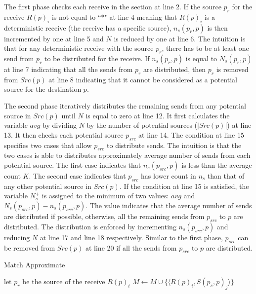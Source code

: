 The first phase checks each receive in the section at line 2. If the source $p_r$ for the receive $R(p)_i$ is not equal to ``$\ast$" at line 4 meaning that $R(p)_i$ is a deterministic receive (the receive has a specific source), $n_s(p_r,p)$ is then incremented by one at line 5 and $N$ is reduced by one at line 6. The intuition is that for any deterministic receive with the source $p_r$, there has to be at least one send from $p_r$ to be distributed for the receive. If $n_s(p_r,p)$ is equal to $N_s(p_r,p)$ at line 7 indicating that all the sends from $p_r$ are distributed, then $p_r$ is removed from $Src(p)$ at line 8 indicating that it cannot be considered as a potential source for the destination $p$. 

The second phase iteratively distributes the remaining sends from any potential source in $Src(p)$ until $N$ is equal to zero at line 12. It first calculates the variable $avg$ by dividing $N$ by the number of potential sources ($|Src(p)|$) at line 13. It then checks each potential source $p_{src}$ at line 14. The condition at line 15 specifies two cases that allow $p_{src}$ to distribute sends. The intuition is that the two cases is able to distributes approximately average number of sends from each potential source. The first case indicates that $n_s(p_{src},p)$ is less than the average count $K$. The second case indicates that $p_{src}$ has lower count in $n_s$ than that of any other potential source in $Src(p)$. 
If the condition at line 15 is satisfied, the variable $N_s^+$ is assigned to the minimum of two values: $avg$ and $N_s(p_{src},p)-\mathit{n_s}(p_{src},p)$. The value indicates that the average number of sends are distributed if possible, otherwise, all the remaining sends from $p_{src}$ to $p$ are distributed.  
The distribution is enforced by incrementing $n_s(p_{src},p)$ and reducing $N$ at line 17 and line 18 respectively. Similar to the first phase, $p_{src}$ can be removed from $Src(p)$ at line 20 if all the sends from $p_{src}$ to $p$ are distributed.  


\begin{algorithm}
\caption{Match Approximate}\label{algo:match}
\begin{algorithmic}[1]
\State let $p_r$ be the source of the receive $R(p)_i$
\State $M\gets M\cup\{\langle R(p)_i,S(p_s,p)_j \rangle\}$
\EndIf
\EndFor
\EndFor
\end{algorithmic}
\end{algorithm}


